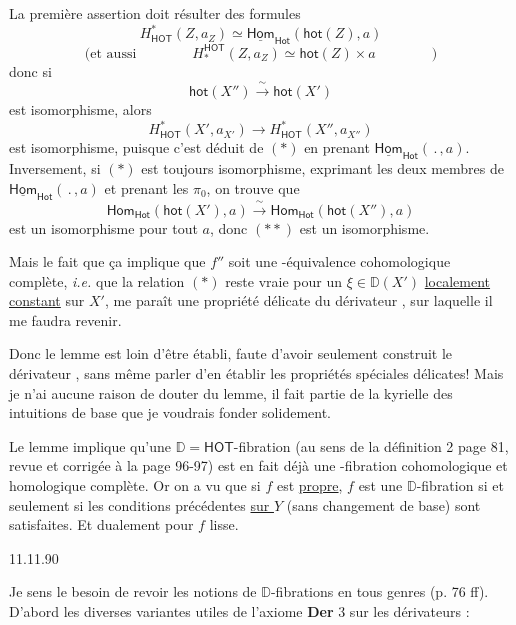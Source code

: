 \documentclass[11pt,leqno]{article}
\newcommand{\printedpage}[1]{\marginpar{\footnotesize p.~#1}}
\newcommand{\msp}[1]{\marginpar{\footnotesize [#1]}}
\newcommand{\DD}{\mathbb{D}}
\newcommand{\HOT}{\mathsf{HOT}}
\begin{document}
La première assertion doit résulter des formules
\[ H^{*}_{\mathsf{HOT}}(Z,a_Z) \simeq \underline{\mathsf{Hom}}_{\mathsf{Hot}}(\mathsf{hot}(Z),a) \tag*{$(*)$} \]
\[ \text{(et aussi} \qquad\qquad H_{*}^{\mathsf{HOT}}(Z,a_Z) \simeq \mathsf{hot}(Z) \times a \qquad\qquad ) \]
donc si
\[ \mathsf{hot}(X'') \xrightarrow{\ \sim\ } \mathsf{hot}(X') \tag*{$(**)$} \]
est isomorphisme, alors
\[ H^{*}_{\mathsf{HOT}}(X', a_{X'}) \longrightarrow H^{*}_{\mathsf{HOT}}(X'', a_{X''}) \]
est isomorphisme, puisque c'est déduit de $(*)$ en prenant $\underline{\mathsf{Hom}}_{\mathsf{Hot}}(\,.\,,a)$. Inversement, si $(*)$ est toujours isomorphisme, exprimant les deux membres de $\underline{\mathsf{Hom}}_{\mathsf{Hot}}(\,.\,,a)$ et prenant les $\pi_0$, on trouve que
\[ \mathsf{Hom}_{\mathsf{Hot}}(\mathsf{hot}(X'),a) \xrightarrow{\ \sim\ } \mathsf{Hom}_{\mathsf{Hot}}(\mathsf{hot}(X''),a) \]
est un isomorphisme pour tout $a$, donc $(**)$ est un isomorphisme.

Mais le fait que ça implique que $f''$ soit une \HOT-équivalence cohomologique complète, \textit{i.e.} que la relation $(*)$ reste vraie pour un $\xi \in \DD(X')$ \underline{localement} \underline{constant} sur $X'$, me paraît une propriété délicate du dérivateur \HOT, sur laquelle il me faudra revenir.

Donc le lemme est loin d'être établi, faute d'avoir seulement construit le dérivateur \HOT, sans même parler d'en établir les propriétés spéciales délicates! Mais je n'ai aucune raison de douter du lemme, il fait partie de la kyrielle des intuitions de base que je voudrais fonder solidement.

\printedpage{66}

\msp{page 111}

Le lemme implique qu'une $\DD = \mathsf{HOT}$-fibration (au sens de la définition 2 page 81, revue et corrigée à la page 96-97) est en fait déjà une \HOT-fibration cohomologique et homologique complète. Or on a vu que si $f$ est \underline{propre}, $f$ est une $\DD$-fibration si et seulement si les conditions précédentes \underline{sur $Y$} (sans changement de base) sont satisfaites. Et dualement pour $f$ lisse.

\begin{flushright}
11.11.90
\end{flushright}

Je sens le besoin de revoir les notions de $\DD$-fibrations en tous genres (p. 76 ff). D'abord les diverses variantes utiles de l'axiome \textbf{Der} 3 sur les dérivateurs :
\end{document}
